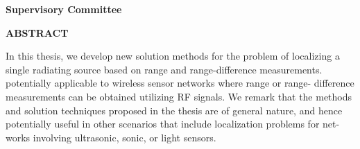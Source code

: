 \newpage
{}

\noindent \textbf{Supervisory Committee}
\tpbreak
\panel

\begin{center}
\textbf{ABSTRACT}
\end{center}

In this thesis, we develop new solution methods for the problem of localizing a single radiating source based on range and range-difference measurements. 
potentially applicable to wireless sensor networks where range or range-
difference measurements can be obtained utilizing RF signals. We remark that the
methods and solution techniques proposed in the thesis are of general nature, and
hence potentially useful in other scenarios that include localization problems for net-
works involving ultrasonic, sonic, or light sensors.